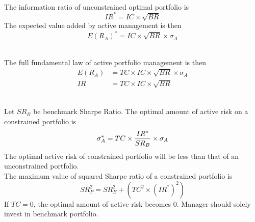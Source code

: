 \begin{remark} \\
The information ratio of unconstrained optimal portfolio is
\begin{equation}
IR^{*} = IC \times \sqrt{BR} \nonumber
\end{equation}
The expected value added by active management is then
\begin{equation}
E(R_A)^{*} = IC \times \sqrt{BR} \times \sigma_A \nonumber
\end{equation}
\end{remark}

\begin{remark} \\
The full fundamental law of active portfolio management is then
\begin{align}
E(R_A) &= TC \times IC \times \sqrt{BR} \times \sigma_A \nonumber\\
IR &= TC \times IC \times \sqrt{BR} \nonumber
\end{align}
\end{remark}

\begin{remark} \\
Let $SR_B$ be benchmark Sharpe Ratio. The optimal amount of active risk on a constrained portfolio is
\begin{equation}
\sigma_{A}^{*} = TC \times \frac{IR^{*}}{SR_B} \times \sigma_A \nonumber \\
\end{equation}
The optimal active risk of constrained portfolio will be less than that of an unconstrained portfolio.\\
The maximum value of squared Sharpe ratio of a constrained portfolio is
\begin{equation}
SR_P^2 = SR_B^2 + (TC^2 \times (IR^{*})^2) \nonumber
\end{equation}
If $TC = 0$, the optimal amount of active risk becomes $0$. Manager should solely invest in benchmark portfolio.
\end{remark}

